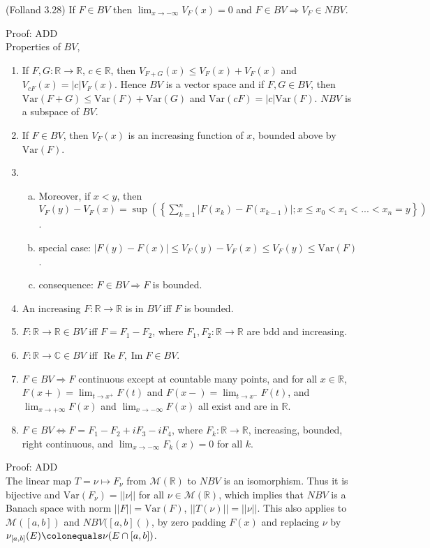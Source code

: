 \documentclass[12pt]{article}
\newcommand{\rimply}[0] { \Rightarrow }
\newcommand{\lrimply}[0] { \Leftrightarrow }
\newcommand{\rarw}[0] { \rightarrow }
\newcommand{ \defeq }[0] { \colonequals }
\renewcommand{\Re}{ \operatorname{Re} }
\renewcommand{\Im}{ \operatorname{Im} }
\newcommand{\reals}[0] { \mathbb{R}}
\newcommand{\complexes}[0] { \mathbb{C}}
\newcommand{\M}[0] { \mathcal{M} }
\newcommand{ \Var } { \textrm{Var} }
\begin{document}
(Folland 3.28) If $F \in BV$ then $\lim_{x \rarw - \infty} V_F(x) = 0$ and $F \in BV \rimply V_F \in NBV$.

\noindent
Proof: ADD \\


Properties of $BV$,

\begin{enumerate}[1)]
\item
If $F,G: \reals \rarw \reals$, $c \in \reals$, then $V_{F+G}(x) \le V_F(x) + V_F(x)$ and $V_{cF}(x) = |c| V_F(x)$. Hence $BV$ is a vector space and if $F,G \in BV$, then $\Var(F+G) \le \Var(F) + \Var(G)$ and $\Var(cF) = |c| \Var(F)$. $NBV$ is a subspace of $BV$.
\item
If $F \in BV$, then $V_F(x)$ is an increasing function of $x$, bounded above by $\Var(F)$.
\item
\begin{enumerate}[a)]
\item
Moreover, if $x < y$, then $V_F(y)-V_F(x) = \sup \left( \left\{ \sum_{k=1}^n | F(x_k) - F(x_{k-1}) | ; x \le x_0 < x_1 < ... < x_{n} = y \right\} \right)$.
\item
special case: $|F(y) - F(x)| \le V_F(y) - V_F(x) \le V_F(y) \le \Var(F)$.
\item
consequence: $F \in BV \rimply F$ is bounded.
\end{enumerate}
\item
An increasing $F: \reals \rarw \reals$ is in $BV$ iff $F$ is bounded.
\item
$F: \reals \rarw \reals \in BV$ iff $F =  F_1-F_2$, where $F_1,F_2: \reals \rarw \reals$ are bdd and increasing.
\item
$F: \reals \rarw \complexes \in BV$ iff $\Re F, \Im F \in BV$.
\item
$F \in BV \rimply F$ continuous except at countable many points, and for all $x \in \reals$, $F(x+) = \lim_{t \rarw x^+} F(t)$ and $F(x-) = \lim_{t \rarw x^-} F(t)$, and $\lim_{x \rarw +\infty} F(x)$ and $\lim_{x \rarw -\infty} F(x)$ all exist and are in $\reals$.
\item
 $F \in BV \lrimply F = F_1 - F_2 + i F_3 - i F_4$, where $F_k : \reals \rarw \reals$, increasing, bounded, right continuous, and $\lim_{x \rarw - \infty} F_k(x) = 0$ for all $k$.
\end{enumerate}


\noindent
Proof: ADD \\


The linear map $T = \nu \mapsto F_\nu$ from $\M(\reals)$ to $NBV$ is an isomorphism. Thus it is bijective and $\Var(F_\nu) = ||\nu||$ for all $\nu \in \M(\reals)$, which implies that $NBV$ is a Banach space with norm $||F|| = \Var(F)$, $||T(\nu)|| = ||\nu||$.  This also applies to $\M([a,b])$ and $NBV([a,b]()$, by zero padding $F(x)$ and replacing $\nu$ by $\nu_{[a,b]}(E) \defeq \nu(E \cap [a,b])$. \\
\end{document}
